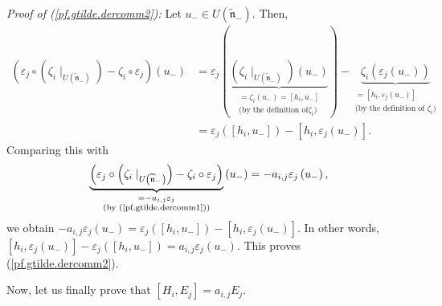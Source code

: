 \documentclass[etingof-lie.tex]{subfiles}
\begin{document}
\textit{Proof of (\ref{pf.gtilde.dercomm2}):} Let $u_{-}\in U\left(
\widetilde{\mathfrak{n}}_{-}\right)  $. Then,%
\begin{align*}
\left(  \varepsilon_{j}\circ\left(  \zeta_{i}\mid_{U\left(
\widetilde{\mathfrak{n}}_{-}\right)  }\right)  -\zeta_{i}\circ\varepsilon
_{j}\right)  \left(  u_{-}\right)   &  =\varepsilon_{j}\left(
\underbrace{\left(  \zeta_{i}\mid_{U\left(  \widetilde{\mathfrak{n}}%
_{-}\right)  }\right)  \left(  u_{-}\right)  }_{\substack{=\zeta_{i}\left(
u_{-}\right)  =\left[  h_{i},u_{-}\right]  \\\text{(by the definition of
}\zeta_{i}\text{)}}}\right)  -\underbrace{\zeta_{i}\left(  \varepsilon
_{j}\left(  u_{-}\right)  \right)  }_{\substack{=\left[  h_{i},\varepsilon
_{j}\left(  u_{-}\right)  \right]  \\\text{(by the definition of }\zeta
_{i}\text{)}}}\\
&  =\varepsilon_{j}\left(  \left[  h_{i},u_{-}\right]  \right)  -\left[
h_{i},\varepsilon_{j}\left(  u_{-}\right)  \right]  .
\end{align*}
Comparing this with%
\[
\underbrace{\left(  \varepsilon_{j}\circ\left(  \zeta_{i}\mid_{U\left(
\widetilde{\mathfrak{n}}_{-}\right)  }\right)  -\zeta_{i}\circ\varepsilon
_{j}\right)  }_{\substack{=-a_{i,j}\varepsilon_{j}\\\text{(by
(\ref{pf.gtilde.dercomm1}))}}}\left(  u_{-}\right)  =-a_{i,j}\varepsilon
_{j}\left(  u_{-}\right)  ,
\]
we obtain $-a_{i,j}\varepsilon_{j}\left(  u_{-}\right)  =\varepsilon
_{j}\left(  \left[  h_{i},u_{-}\right]  \right)  -\left[  h_{i},\varepsilon
_{j}\left(  u_{-}\right)  \right]  $. In other words, $\left[  h_{i}%
,\varepsilon_{j}\left(  u_{-}\right)  \right]  -\varepsilon_{j}\left(  \left[
h_{i},u_{-}\right]  \right)  =a_{i,j}\varepsilon_{j}\left(  u_{-}\right)  $.
This proves (\ref{pf.gtilde.dercomm2}).

Now, let us finally prove that $\left[  H_{i},E_{j}\right]  =a_{i,j}E_{j}$.
\end{document}
